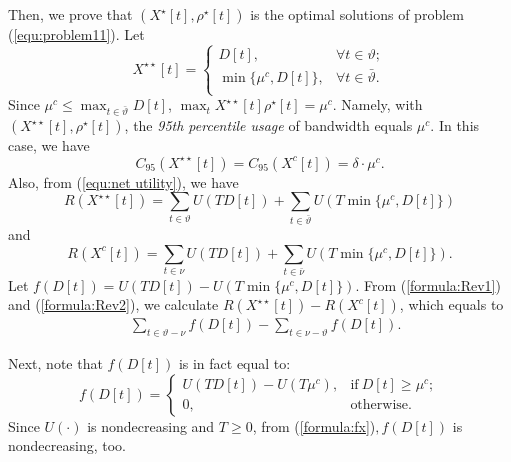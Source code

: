 \documentclass[10pt,journal,compsoc]{IEEEtran}
\begin{document}
\noindent
Then, we prove that $(X^{\star}[t],\rho^{\star}[t])$ is the optimal solutions of problem (\ref{equ:problem11}). Let 
\begin{equation}\label{equ:lemmasatisfied}
X^{\star \star}[t]=
\begin{cases}
D[t], &\forall t \in \vartheta;\\
\min\{\mu^{c},D[t]\}, &\forall t \in \bar{\vartheta}.\\
\end{cases}
\end{equation}
Since $\mu^{c}\leq \max_{t \in \bar{\vartheta}}D[t]$, $\max_{t} X^{\star \star}[t] \rho^{\star}[t]=\mu^{c}$. Namely, with $(X^{\star \star}[t],\rho^{\star}[t])$, the \emph{95th percentile usage} of bandwidth equals $\mu^{c}$. In this case, we have
\begin{equation}\label{formula:Cost_Eq}
C_{95}(X^{\star \star}[t])=C_{95}(X^c[t])=\delta \cdot \mu^{c}.
\end{equation}
\noindent
Also, from (\ref{equ:net utility}), we have
\begin{equation}\label{formula:Rev1}
R(X^{\star \star}[t])=\sum_{t\in\vartheta}U(TD[t])+ \sum_{t\in\bar{\vartheta}}U(T\min\{\mu^{c},D[t]\})
\end{equation}
and
\begin{equation}\label{formula:Rev2}
R(X^c[t])= \sum_{t\in\nu}U(TD[t])+ \sum_{t\in\bar{\nu}}U(T\min\{\mu^{c},D[t]\}).
\end{equation}
Let $f(D[t])=U(TD[t])- U(T\min\{\mu^{c},D[t]\})$. From (\ref{formula:Rev1}) and (\ref{formula:Rev2}),  we calculate $R(X^{\star \star}[t])-R(X^c[t])$, which equals to
\begin{equation}\label{formula:Rev_Diff}
\begin{aligned}
&\sum_{t\in \vartheta-\nu} f(D[t])- \sum_{t\in \nu-\vartheta} f(D[t]).
\end{aligned}
\end{equation}



Next, note that $f(D[t])$ is in fact equal to:
\begin{equation}\label{formula:fx}
f(D[t])=
\begin{cases}
U(TD[t])- U(T\mu^{c}), & \text{if} \ D[t] \geq \mu^{c};\\
0, & \text{otherwise}.
\end{cases}
\end{equation}
\noindent
Since  $U(\cdot)$ is nondecreasing and $T \geq 0$, from (\ref{formula:fx})$, f(D[t])$ is nondecreasing, too.
\end{document}
